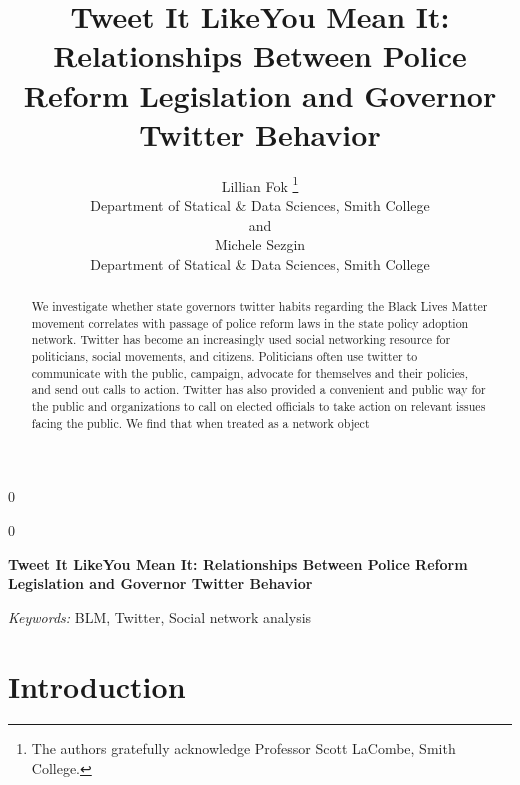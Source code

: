 \documentclass[12pt]{article}
\newcommand{\blind}{0}
\begin{document}
\def\spacingset#1{\renewcommand{\baselinestretch}%
{#1}\small\normalsize} \spacingset{1}



\blind
{
  \title{\bf Tweet It LikeYou Mean It: Relationships Between Police
Reform Legislation and Governor Twitter Behavior}

  \author{
        Lillian Fok \thanks{The authors gratefully acknowledge Professor
Scott LaCombe, Smith College.} \\
    Department of Statical \& Data Sciences, Smith College\\
     and \\     Michele Sezgin \\
    Department of Statical \& Data Sciences, Smith College\\
      }
  \maketitle
} \fi

\blind
{
  \bigskip
  \bigskip
  \bigskip
  \begin{center}
    {\LARGE\bf Tweet It LikeYou Mean It: Relationships Between Police
Reform Legislation and Governor Twitter Behavior}
  \end{center}
  \medskip
} \fi

\bigskip
\begin{abstract}
We investigate whether state governors twitter habits regarding the
Black Lives Matter movement correlates with passage of police reform
laws in the state policy adoption network. Twitter has become an
increasingly used social networking resource for politicians, social
movements, and citizens. Politicians often use twitter to communicate
with the public, campaign, advocate for themselves and their policies,
and send out calls to action. Twitter has also provided a convenient and
public way for the public and organizations to call on elected officials
to take action on relevant issues facing the public. We find that when
treated as a network object
\end{abstract}

\noindent%
{\it Keywords:} BLM, Twitter, Social network analysis
\vfill

\newpage
\spacingset{1.45} %

\hypertarget{introduction}{%
\section{Introduction}\label{introduction}}
\end{document}

